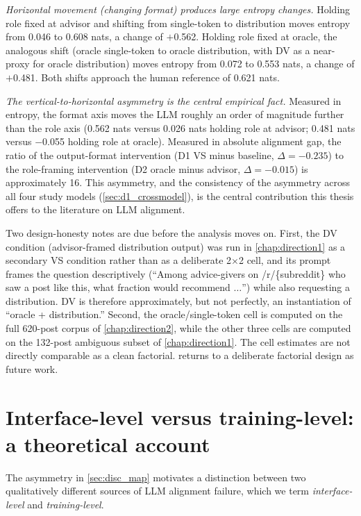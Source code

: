 \textit{Horizontal movement (changing format) produces large entropy
changes.} Holding role fixed at advisor and shifting from single-token
to distribution moves entropy from 0.046 to 0.608 nats, a change of
$+$0.562. Holding role fixed at oracle, the analogous shift (oracle
single-token to oracle distribution, with DV as a near-proxy for
oracle distribution) moves entropy from 0.072 to 0.553 nats, a
change of $+$0.481. Both shifts approach the human reference of 0.621
nats.

\textit{The vertical-to-horizontal asymmetry is the central
empirical fact.} Measured in entropy, the format axis moves the LLM
roughly an order of magnitude further than the role axis (0.562 nats
versus 0.026 nats holding role at advisor; 0.481 nats versus
$-$0.055 holding role at oracle). Measured in absolute alignment gap,
the ratio of the output-format intervention (D1 VS minus baseline,
$\Delta = -0.235$) to the role-framing intervention (D2 oracle minus
advisor, $\Delta = -0.015$) is approximately 16. This asymmetry, and
the consistency of the asymmetry across all four study models
(\cref{sec:d1_crossmodel}), is the central contribution this thesis
offers to the literature on LLM alignment.

Two design-honesty notes are due before the analysis moves on. First,
the DV condition (advisor-framed distribution output) was run in
\cref{chap:direction1} as a secondary VS condition rather than as a
deliberate 2$\times$2 cell, and its prompt frames the question
descriptively (``Among advice-givers on /r/\{subreddit\} who saw a
post like this, what fraction would recommend $\ldots$'') while
also requesting a distribution. DV is therefore approximately, but not
perfectly, an instantiation of ``oracle + distribution.'' Second, the
oracle/single-token cell is computed on the full 620-post corpus of
\cref{chap:direction2}, while the other three cells are computed on
the 132-post ambiguous subset of \cref{chap:direction1}. The cell
estimates are not directly comparable as a clean factorial.
 returns to a deliberate factorial design
as future work.

\section{Interface-level versus training-level: a theoretical account}
\label{sec:disc_interface_training}

The asymmetry in \cref{sec:disc_map} motivates a distinction between
two qualitatively different sources of LLM alignment failure, which
we term \emph{interface-level} and \emph{training-level}.

